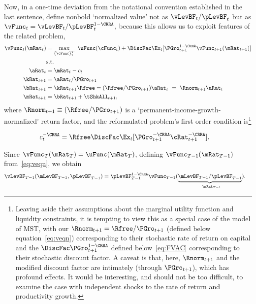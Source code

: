 \documentclass[BufferStockTheory]{subfiles}
\begin{document}
Now, in a one-time deviation from the notational convention established in the last sentence, define nonbold `normalized value' not as $\vLevBF_{t}/\pLevBF_{t}$ but as $\vFunc_{t} = \vLevBF_{t}/\pLevBF_{t}^{1-\CRRA}$, because this allows us to exploit features of the related problem,
\begin{align}
  \vFunc_{t}(\mRat_{t})  & = \max_{{\{\cFunc\}}_{t}^{T}}~  \uFunc(\cFunc_{t}) +\DiscFac \Ex_{t}[\PGro_{t+1}^{1-\CRRA}\vFunc_{t+1}({\mRat}_{t+1})] \notag \\
                         & \mbox{s.t.}  \label{eq:veqn}
  \\ {\aRat}_{t}  & = \mRat_{t}-c_{t}  \notag
  \\ {\kRat}_{t+1} & = \aRat_{t}/\PGro_{t+1}  \notag
  \\ {\bRat}_{t+1}  & = {\kRat}_{t+1}\Rfree = (\Rfree/\PGro_{t+1})\aRat_{t}  ~ = ~ \Rnorm_{t+1}\aRat_{t}  \notag
  \\ \mRat_{t+1}  & = \bRat_{t+1}+\tShkAll_{t+1}  \notag, %
\end{align}
where $\Rnorm_{t+1}\equiv (\Rfree/\PGro_{t+1})$ is a `permanent-income-growth-normalized' return factor, and the reformulated problem's first order condition is\footnote{Leaving aside their assumptions about the marginal utility function and liquidity constraints, it is tempting to view this as a special case of the model of MST, with our $\Rnorm_{t+1}=\Rfree/\PGro_{t+1}$ (defined below equation~\eqref{eq:veqn}) corresponding to their stochastic rate of return on capital and the {\FVAF} $\DiscFac \PGro_{t+1}^{1-\CRRA}$ defined below~\eqref{eq:FVAC} corresponding to their stochastic discount factor.  A caveat is that, here, $\Rnorm_{t+1}$ and the modified discount factor are intimately (through $\PGro_{t+1}$), which has profound effects.  It would be interesting, and should not be too difficult, to examine the case with independent shocks to the rate of return and productivity growth.}

\begin{align}
  c_{t}^{-\CRRA}  & = \Rfree \DiscFac \Ex_{t}[ {\PGro}_{t+1}^{-\CRRA} {\cRat}
                    _{t+1}^{-\CRRA}].  \label{eq:scaledeuler}
\end{align}

Since $\vFunc_{T}(\mRat_{T}) = \uFunc(\mRat_{T})$, defining $\vFunc_{T-1}(\mRat_{T-1})$ from~\eqref{eq:veqn}, we obtain
\begin{align*}
  \vLevBF_{T-1}(\mLevBF_{T-1},\pLevBF_{T-1})  & = \pLevBF_{T-1}^{1-\CRRA} \vFunc_{T-1}(\underbrace{\mLevBF_{T-1}/\pLevBF_{T-1}}_{=\mRat_{T-1}}).
\end{align*}
\end{document}
